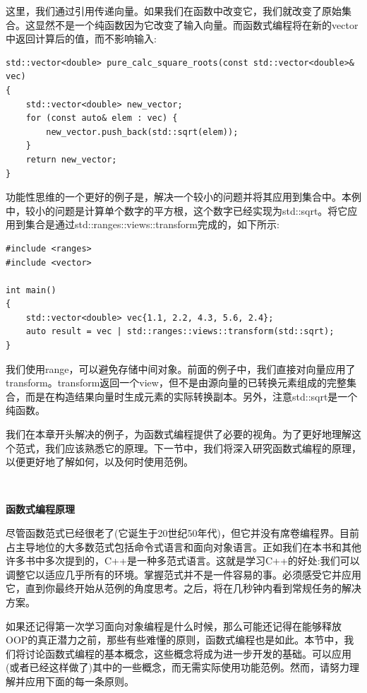 这里，我们通过引用传递向量。如果我们在函数中改变它，我们就改变了原始集合。这显然不是一个纯函数因为它改变了输入向量。而函数式编程将在新的vector中返回计算后的值，而不影响输入: \par

\begin{lstlisting}[caption={}]
std::vector<double> pure_calc_square_roots(const std::vector<double>& vec)
{
	std::vector<double> new_vector;
	for (const auto& elem : vec) {
		new_vector.push_back(std::sqrt(elem));
	}
	return new_vector;
}
\end{lstlisting}

功能性思维的一个更好的例子是，解决一个较小的问题并将其应用到集合中。本例中，较小的问题是计算单个数字的平方根，这个数字已经实现为std::sqrt。将它应用到集合是通过std::ranges::views::transform完成的，如下所示: \par

\begin{lstlisting}[caption={}]
#include <ranges>
#include <vector>

int main()
{
	std::vector<double> vec{1.1, 2.2, 4.3, 5.6, 2.4};
	auto result = vec | std::ranges::views::transform(std::sqrt);
}
\end{lstlisting}

我们使用range，可以避免存储中间对象。前面的例子中，我们直接对向量应用了transform。transform返回一个view，但不是由源向量的已转换元素组成的完整集合，而是在构造结果向量时生成元素的实际转换副本。另外，注意std::sqrt是一个纯函数。 \par
我们在本章开头解决的例子，为函数式编程提供了必要的视角。为了更好地理解这个范式，我们应该熟悉它的原理。下一节中，我们将深入研究函数式编程的原理，以便更好地了解如何，以及何时使用范例。 \par

\noindent\textbf{}\ \par
\textbf{函数式编程原理} \ \par
尽管函数范式已经很老了(它诞生于20世纪50年代)，但它并没有席卷编程界。目前占主导地位的大多数范式包括命令式语言和面向对象语言。正如我们在本书和其他许多书中多次提到的，C++是一种多范式语言。这就是学习C++的好处:我们可以调整它以适应几乎所有的环境。掌握范式并不是一件容易的事。必须感受它并应用它，直到你最终开始从范例的角度思考。之后，将在几秒钟内看到常规任务的解决方案。 \par
如果还记得第一次学习面向对象编程是什么时候，那么可能还记得在能够释放OOP的真正潜力之前，那些有些难懂的原则，函数式编程也是如此。本节中，我们将讨论函数式编程的基本概念，这些概念将成为进一步开发的基础。可以应用(或者已经这样做了)其中的一些概念，而无需实际使用功能范例。然而，请努力理解并应用下面的每一条原则。 \par

